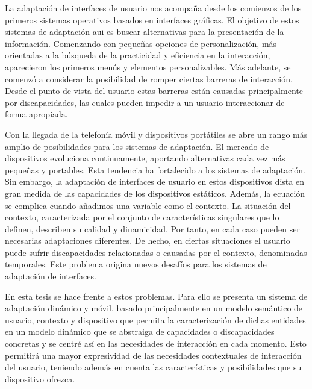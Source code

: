 \begin{resumen} %

La adaptación de interfaces de usuario nos acompaña desde los comienzos de los
primeros sistemas operativos basados en interfaces gráficas. El objetivo de estos
sistemas de adaptación \acs{aui} es buscar alternativas para la presentación
de la información. Comenzando con pequeñas opciones de personalización, más 
orientadas a la búsqueda de la practicidad y eficiencia en la interacción, 
aparecieron los primeros menús y elementos personalizables. Más adelante, se 
comenzó a considerar la posibilidad de romper ciertas barreras de interacción. 
Desde el punto de vista del usuario estas barreras están causadas principalmente 
por discapacidades, las cuales pueden impedir a un usuario interaccionar de 
forma apropiada. 

Con la llegada de la telefonía móvil y dispositivos portátiles se abre
un rango más amplio de posibilidades para los sistemas de adaptación. El mercado 
de dispositivos evoluciona continuamente, aportando alternativas cada vez más 
pequeñas y portables. Esta tendencia ha fortalecido a los sistemas de adaptación. 
Sin embargo, la adaptación de interfaces de usuario en estos dispositivos dista 
en gran medida de las capacidades de los dispositivos estáticos. Además, la ecuación
se complica cuando añadimos una variable como el contexto. La situación del contexto,
caracterizada por el conjunto de características singulares que lo definen, describen
su calidad y dinamicidad. Por tanto, en cada caso pueden ser necesarias adaptaciones
diferentes. De hecho, en ciertas situaciones el usuario puede sufrir discapacidades 
relacionadas o causadas por el contexto, denominadas temporales. Este problema 
origina nuevos desafíos para los sistemas de adaptación de interfaces. 

En esta tesis se hace frente a estos problemas. Para ello se presenta un sistema
de adaptación dinámico y móvil, basado principalmente en un modelo semántico de
usuario, contexto y dispositivo que permita la caracterización de dichas
entidades en un modelo dinámico que se abstraiga de capacidades o discapacidades
concretas y se centré así en las necesidades de interacción en cada momento.
Esto permitirá una mayor expresividad de las necesidades contextuales de
interacción del usuario, teniendo además en cuenta las características y
posibilidades que su dispositivo ofrezca.


\end{resumen}











